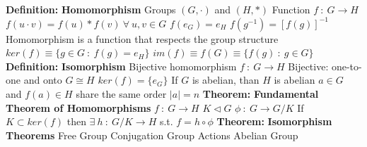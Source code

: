 \documentclass[14pt]{extarticle}
\def\Definition{{\color{blue} \textbf{Definition:} }}
\def\Theorem{{\color{red} \textbf{Theorem:} }}
\begin{document}
\begin{outline}
		\1	\Definition \textbf{Homomorphism}
			\2	Groups $(G,\cdot)$ and $(H,*)$
			\2	Function $f~:~G \rightarrow H$
				\3	$f(u \cdot v) = f(u) * f(v)~\forall~u,v \in G$
				\3	$f(e_G) = e_H$
				\3	$f(g^{-1}) = [f(g)]^{-1}$
			\2	Homomorphism is a function that respects the group structure
			\2	$ker(f) \equiv \{g \in G~:~f(g) = e_H\}$
			\2	$im(f) \equiv f(G) \equiv \{f(g)~:~g \in G\}$	
		\1	\Definition \textbf{Isomorphism}
			\2	Bijective homomorphism $f~:~G \rightarrow H$
				\3	Bijective: one-to-one and onto
			\2	$G \cong H$
			\2	$ker(f) = \{e_G\}$
			\2	If $G$ is abelian, than $H$ is abelian
			\2	$a \in G$ and $f(a) \in H$ share the same order $|a| = n$		
		\1	\Theorem \textbf{Fundamental Theorem of Homomorphisms}
			\2	$f~:~G \rightarrow H$
			\2	$K \triangleleft G$
			\2	$\phi~:~G \rightarrow G/K$
			\2	{\color{purple}If $K \subset ker(f)$ then $\exists~h~:~G/K \rightarrow H$ 
						s.t. $f = h \circ \phi$}
		\1	\Theorem \textbf{Isomorphism Theorems}
		\1	Free Group		
		\1	Conjugation
		\1	Group Actions
		\1	Abelian Group
	
	\end{outline}
\end{document}
